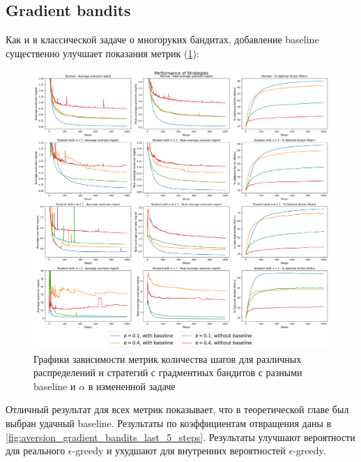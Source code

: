 \subsection{Gradient bandits}

Как и в классической задаче о многоруких бандитах, добавление baseline существенно улучшает показания метрик (\ref{fig:aversion_gradient_check_strategies_by_distribution}):

\begin{figure}[ht!] %
\centering
\includegraphics[width=6in]{Figures/experiments_aversion/gradient_bandits/check_strategies_by_distribution.png}
\caption{Графики зависимости метрик количества шагов для различных распределений и стратегий с градментных бандитов с разными baseline и $\alpha$ в измененной задаче}
\label{fig:aversion_gradient_check_strategies_by_distribution}
\end{figure}

Отличный результат для всех метрик показывает, что в теоретической главе был выбран удачный baseline. Результаты по коэффициентам отвращения даны в \ref{fig:aversion_gradient_bandits_last_5_steps}. Результаты улучшают вероятности для реального $\epsilon$-greedy и ухудшают для внутренних вероятностей $\epsilon$-greedy.

